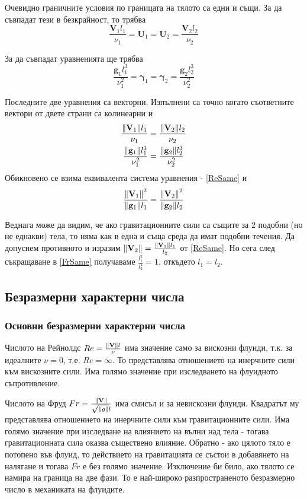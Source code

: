 \documentclass[bulgarian, 12pt]{article}
\begin{document}
Очевидно граничните условия по границата на тялото са едни и същи.
За да съвпадат тези в безкрайност, то трябва
\begin{equation}
	\frac{\mathbf{V}_1 l_1}{\nu_1} = \mathbf{U}_1 = \mathbf{U}_2 = \frac{\mathbf{V}_2 l_2}{\nu_2}
\end{equation}

За да съвпадат уравненията ще трябва
\begin{equation}
	\frac{\mathbf{g}_1 l_1^3}{\nu_1^2} = \bm{\gamma}_1 = \bm{\gamma}_2 = \frac{\mathbf{g}_2 l_2^3}{\nu_2^2}
\end{equation}

Последните две уравнения са векторни. Изпълнени са точно когато съответните вектори от двете страни са колинеарни и
\begin{gather}
	\label{ReSame} \frac{\norm{\mathbf{V}_1} l_1}{\nu_1} = \frac{\norm{\mathbf{V}_2} l_2}{\nu_2}\\
	\frac{\norm{\mathbf{g}_1} l_1^3}{\nu_1^2} = \frac{\norm{\mathbf{g}_2} l_2^3}{\nu_2^2}
\end{gather}
Обикновено се взима еквивалента система уравнения - \eqref{ReSame} и 
\begin{equation}
	\label{FrSame} \frac{\norm{\mathbf{V}_1}^2}{\norm{\mathbf{g}_1} l_1} = \frac{\norm{\mathbf{V}_2}^2}{\norm{\mathbf{g}_2} l_2}
\end{equation}

Веднага може да видим, че ако гравитационните сили са същите за $2$ подобни (но не еднакви) тела, то няма как в една и съща среда да имат подобни течения.
Да допуснем противното и изразим $\norm{\mathbf{V}_2} = \frac{\norm{\mathbf{V}_1} l_1}{l_2}$ от \eqref{ReSame}.
Но сега след съкращаване в \eqref{FrSame} получаваме $\frac{l_1^2}{l_2^2} = 1$, откъдето $l_1 = l_2$.

\subsection{Безразмерни характерни числа}
\subsubsection{Основни безразмерни характерни числа}
Числото на Рейнолдс $Re = \frac{\norm{\mathbf{V}} l}{\nu}$ има значение само за вискозни флуиди, т.к. за идеалните $\nu = 0$, т.е. $Re = \infty$.
То представлява отношението на инерчните сили към вискозните сили.
Има голямо значение при изследването на флуидното съпротивление.

Числото на Фруд $Fr = \frac{\norm{\mathbf{V}}}{\sqrt{\norm{g}} l}$ има смисъл и за невискозни флуиди.
Квадратът му представлява отношението на инерчните сили към гравитационните сили. 
Има голямо значение при изследване на влиянието на вълни над тела - тогава гравитационната сила оказва съществено влияние.
Обратно - ако цялото тяло е потопено във флуид, то действието на гравитацията се състои в добавянето на налягане и тогава $Fr$ е без голямо значение.
Изключение би било, ако тялото се намира на граница на две фази.
То е най-широко разпространеното безразмерно число в механиката на флуидите.
\end{document}
